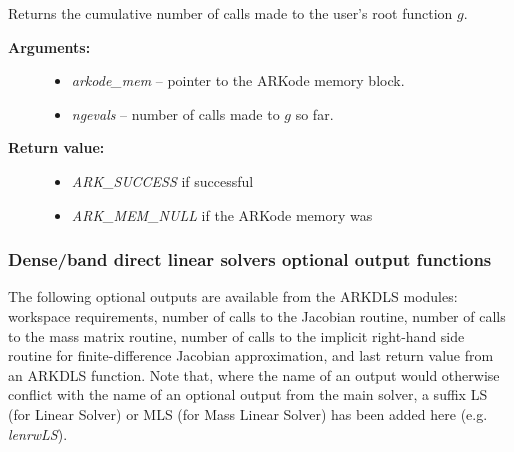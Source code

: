 \documentclass[letterpaper,10pt,english]{sphinxmanual}
\begin{document}
\begin{fulllineitems}
\label{c_interface/User_callable:c.ARKodeGetNumGEvals}
Returns the cumulative number of calls made to the
user's root function \(g\).
\begin{description}
\item[{\textbf{Arguments:}}] \leavevmode\begin{itemize}
\item {} 
\emph{arkode\_mem} -- pointer to the ARKode memory block.

\item {} 
\emph{ngevals} -- number of calls made to \(g\) so far.

\end{itemize}

\item[{\textbf{Return value:}}] \leavevmode\begin{itemize}
\item {} 
\emph{ARK\_SUCCESS} if successful

\item {} 
\emph{ARK\_MEM\_NULL} if the ARKode memory was 

\end{itemize}

\end{description}

\end{fulllineitems}



\subsubsection{Dense/band direct linear solvers optional output functions}
\label{c_interface/User_callable:cinterface-arkdlsoutputs}\label{c_interface/User_callable:dense-band-direct-linear-solvers-optional-output-functions}
The following optional outputs are available from the ARKDLS
modules: workspace requirements, number of calls to the Jacobian
routine, number of calls to the mass matrix routine, number of calls
to the implicit right-hand side routine for finite-difference Jacobian
approximation, and last return value from an ARKDLS function.  Note
that, where the name of an output would otherwise conflict with the
name of an optional output from the main solver, a suffix LS (for
Linear Solver) or MLS (for Mass Linear Solver) has been added here
(e.g. \emph{lenrwLS}).
\end{document}
